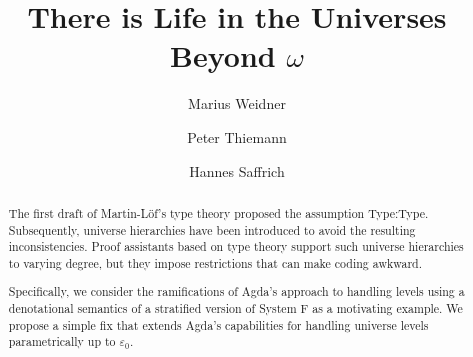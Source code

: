 \documentclass[manuscript,screen,review,anonymous]{acmart}
\begin{document}
\title{There is Life in the Universes Beyond $\omega$}

\author{Marius Weidner}

\author{Peter Thiemann}

\author{Hannes Saffrich}


\begin{abstract}
  The first draft of Martin-L\"{o}f's type theory proposed the
  assumption Type:Type. Subsequently, universe hierarchies have been
  introduced to avoid the resulting inconsistencies. 
  Proof assistants based on type theory support such universe hierarchies
  to varying degree, but they impose restrictions that can make coding
  awkward.

  Specifically, we consider the ramifications of Agda's
  approach to handling levels using a denotational semantics of a
  stratified version of System F as a motivating example.
  We propose a simple fix that extends Agda's capabilities for handling
  universe levels parametrically up to $\varepsilon_0$.
\end{abstract}



\end{document}
